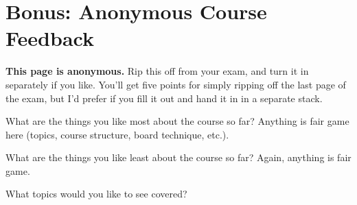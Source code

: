 \documentclass[11pt]{article}
\begin{document}
\newpage
\section{Bonus: Anonymous Course Feedback}

{\bf This page is anonymous.}  Rip this off from your exam, and turn it
in separately if you like.  You'll get five points for simply ripping
off the last page of the exam, but I'd prefer if you fill it out and
hand it in in a separate stack.
\vspace{.5in}

What are the things you like most about the course so far?  Anything is
fair game here (topics, course structure, board technique, etc.).
\vspace{1.5in}


What are the things you like least about the course so far?  Again,
anything is fair game.
\vspace{1in}


What topics would you like to see covered?
\vspace{1in}




\label{lastpage}
\end{document}
